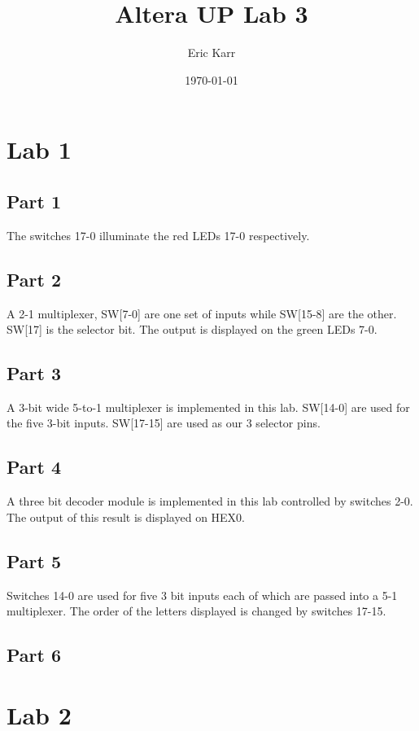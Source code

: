 \documentclass[oneside,letterpaper,12pt,titlepage]{article}
\begin{document}
\author{Eric Karr}
\title{Altera UP Lab 3}
\date{\today}

\maketitle

\section{Lab 1}

\subsection{Part 1}
The switches 17-0 illuminate the red LEDs 17-0 respectively.

\subsection{Part 2}
A 2-1 multiplexer, SW[7-0] are one set of inputs while SW[15-8] are the other. SW[17] is the selector bit. The output is displayed on the green LEDs 7-0.

\subsection{Part 3}
A 3-bit wide 5-to-1 multiplexer is implemented in this lab. SW[14-0] are used for the five 3-bit inputs. SW[17-15] are used as our 3 selector pins.

\subsection{Part 4}
A three bit decoder module is implemented in this lab controlled by switches 2-0. The output of this result is displayed on HEX0.

\subsection{Part 5}
Switches 14-0 are used for five 3 bit inputs each of which are passed into a 5-1 multiplexer. The order of the letters displayed is changed by switches 17-15. 

\subsection{Part 6}

\section{Lab 2}
\end{document}

